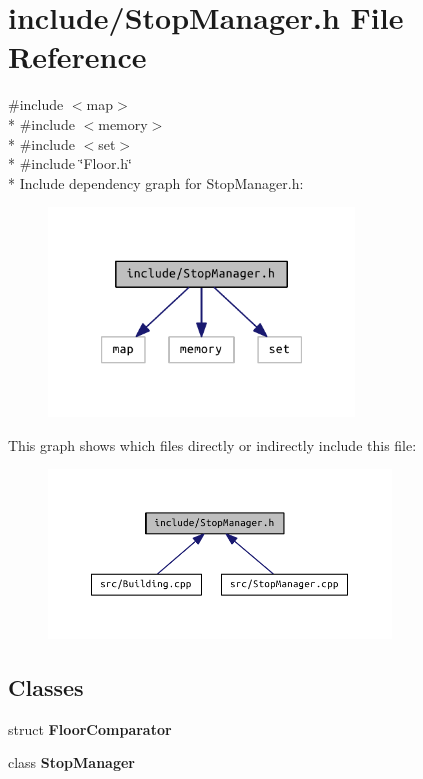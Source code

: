 \section{include/\+Stop\+Manager.h File Reference}
\label{_stop_manager_8h}
{\ttfamily \#include $<$map$>$}\\*
{\ttfamily \#include $<$memory$>$}\\*
{\ttfamily \#include $<$set$>$}\\*
{\ttfamily \#include \char`\"{}Floor.\+h\char`\"{}}\\*
Include dependency graph for Stop\+Manager.\+h\+:
\nopagebreak
\begin{figure}[H]
\begin{center}
\leavevmode
\includegraphics[width=230pt]{_stop_manager_8h__incl}
\end{center}
\end{figure}
This graph shows which files directly or indirectly include this file\+:
\nopagebreak
\begin{figure}[H]
\begin{center}
\leavevmode
\includegraphics[width=258pt]{_stop_manager_8h__dep__incl}
\end{center}
\end{figure}
\subsection*{Classes}
\begin{DoxyCompactItemize}
\item 
struct {\bf Floor\+Comparator}
\item 
class {\bf Stop\+Manager}
\end{DoxyCompactItemize}
